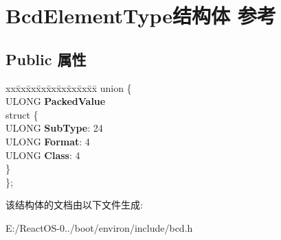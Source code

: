 \hypertarget{struct_bcd_element_type}{}\section{Bcd\+Element\+Type结构体 参考}
\label{struct_bcd_element_type}
\subsection*{Public 属性}
\begin{DoxyCompactItemize}
\item 
\mbox{\label{struct_bcd_element_type_a7a7c7143cd1f181ddf1d191817df3798}} 
\begin{tabbing}
xx\=xx\=xx\=xx\=xx\=xx\=xx\=xx\=xx\=\kill
union \{\\
\>ULONG {\bfseries PackedValue}\\
\mbox{\label{union_bcd_element_type_1_1_0D94_a238d31d84857ed566af576dcb52ce420}} 
\>struct \{\\
\>\>ULONG {\bfseries SubType}: 24\\
\>\>ULONG {\bfseries Format}: 4\\
\>\>ULONG {\bfseries Class}: 4\\
\>\} \\
\}; \\

\end{tabbing}\end{DoxyCompactItemize}


该结构体的文档由以下文件生成\+:\begin{DoxyCompactItemize}
\item 
E\+:/\+React\+O\+S-\/0../boot/environ/include/bcd.\+h\end{DoxyCompactItemize}
